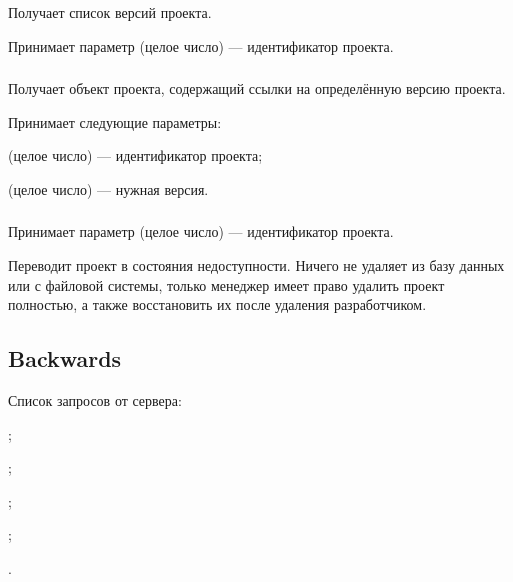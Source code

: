 \subsubsection{}

Получает список версий проекта.

Принимает параметр  (целое число) — идентификатор проекта.

\subsubsection{}

Получает объект проекта, содержащий ссылки на определённую версию проекта.

Принимает следующие параметры:

\begin{icItems}
	\item {} (целое число) — идентификатор проекта;
	\item {} (целое число) — нужная версия.
\end{icItems}

\subsubsection{}

Принимает параметр  (целое число) — идентификатор проекта.

Переводит проект в состояния недоступности. Ничего не удаляет из базу данных или с файловой системы, только менеджер имеет право удалить проект полностью, а также восстановить их после удаления разработчиком.

\subsection{Backwards}

Список запросов от сервера:
\begin{icItems}
	\item {};
	\item {};
	\item {};
	\item {};
	\item {}.
\end{icItems}

\subsubsection{}


